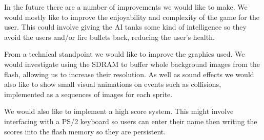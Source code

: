 \documentclass{article}
\begin{document}
In the future there are a number of improvements we would like to make. We would mostly like to improve the enjoyability and complexity of the game for the user. This could involve giving the AI tanks some kind of intelligence so they avoid the users and/or fire bullets back, reducing the user's health.

From a technical standpoint we would like to improve the graphics used. We would investigate using the SDRAM to buffer whole background images from the flash, allowing us to increase their resolution. As well as sound effects we would also like to show small visual animations on events such as collisions, implemented as a sequences of images for each sprite.

We would also like to implement a high score system. This might involve interfacing with a PS/2 keyboard so users can enter their name then writing the scores into the flash memory so they are persistent.
\end{document}

